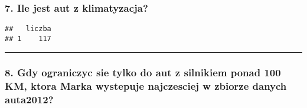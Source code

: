\documentclass[]{article}
\newenvironment{Shaded}{\begin{snugshade}}{\end{snugshade}}
\newcommand{\KeywordTok}[1]{\textcolor[rgb]{0.13,0.29,0.53}{\textbf{#1}}}
\newcommand{\DataTypeTok}[1]{\textcolor[rgb]{0.13,0.29,0.53}{#1}}
\newcommand{\DecValTok}[1]{\textcolor[rgb]{0.00,0.00,0.81}{#1}}
\newcommand{\StringTok}[1]{\textcolor[rgb]{0.31,0.60,0.02}{#1}}
\newcommand{\OperatorTok}[1]{\textcolor[rgb]{0.81,0.36,0.00}{\textbf{#1}}}
\newcommand{\NormalTok}[1]{#1}
\begin{document}
\subsubsection{7. Ile jest aut z
klimatyzacja?}\label{ile-jest-aut-z-klimatyzacja}

\begin{Shaded}
\end{Shaded}

\begin{verbatim}
##   liczba
## 1    117
\end{verbatim}

\begin{center}\rule{0.5\linewidth}{\linethickness}\end{center}

\subsubsection{8. Gdy ograniczyc sie tylko do aut z silnikiem ponad 100
KM, ktora Marka wystepuje najczesciej w zbiorze danych
auta2012?}\label{gdy-ograniczyc-sie-tylko-do-aut-z-silnikiem-ponad-100-km-ktora-marka-wystepuje-najczesciej-w-zbiorze-danych-auta2012}

\begin{Shaded}
\end{Shaded}
\end{document}
